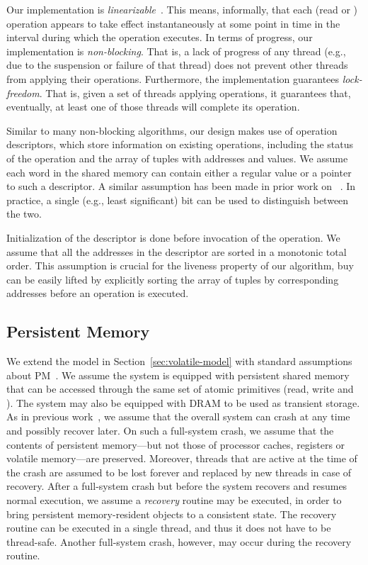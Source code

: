 Our \mcas{} implementation is \emph{linearizable}~\cite{HW+91}. 
This means, informally, that each (read or \mcas{}) operation appears to take effect instantaneously 
at some point in time in the interval during which the operation executes.
In terms of progress, our \mcas{} implementation is \emph{non-blocking}.
That is, a lack of progress of any thread (e.g., due to the suspension or failure of that thread) does not 
prevent other threads from applying their operations. Furthermore, the \mcas{} implementation guarantees \emph{lock-freedom}.
That is, given a set of threads applying operations, %
it guarantees that, eventually, at least one of those threads will complete its operation.

Similar to many non-blocking algorithms, our design makes use of operation descriptors, which store information on 
existing \mcas{} operations, including the status of the operation and the array of tuples with addresses and values.
We assume each word in the shared memory can contain either a regular value or a pointer to such a descriptor.
A similar assumption has been made in prior work on \mcas{}~\cite{feldman15, harris02, sundell11, wang18}.
In practice, a single (e.g., least significant) bit can be used to distinguish between the two.

Initialization of the descriptor is done before invocation of the \mcas{} operation.
We assume that all the addresses in the descriptor are sorted in a monotonic total order.
This assumption is crucial for the liveness property of our algorithm, buy can be easily lifted by explicitly sorting the array of tuples by corresponding addresses before an 
\mcas{} operation is executed.


\subsection{Persistent Memory}
We extend the model in Section~\ref{sec:volatile-model} with standard assumptions about PM~\cite{cohen18, david18,FriedmanHMP18,izraelevitz16}.
We assume the system is equipped with
persistent shared memory that can be accessed through the same set of atomic primitives 
(read, write and \cas{}). 
The system may also be equipped with DRAM to be used as transient storage.
As in previous work~\cite{izraelevitz16}, we assume that the overall system can crash at any time
and possibly recover later. 
On such a full-system crash, we assume that the contents of persistent memory---but not those of processor caches, registers or volatile memory---are preserved. 
Moreover, threads that are active at the time of the crash are assumed to be lost
forever and replaced by new threads in case of recovery. 
After a full-system crash but before the system recovers and resumes normal execution, 
we assume a \emph{recovery} routine may be executed, in order to bring persistent 
memory-resident objects to a consistent state.
The recovery routine can be executed in a single thread, and thus it does not have to 
be thread-safe. 
Another full-system crash, however, may occur during the recovery routine.

